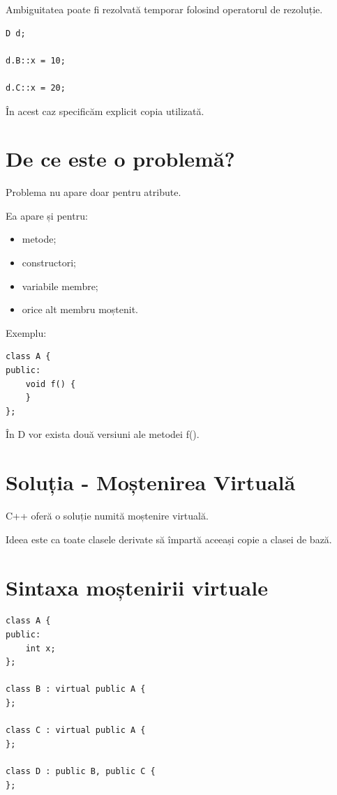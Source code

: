 \documentclass[12pt,a4paper]{article}
\begin{document}
Ambiguitatea poate fi rezolvată temporar folosind operatorul de rezoluție.

\begin{verbatim}
D d;

d.B::x = 10;

d.C::x = 20;
\end{verbatim}

În acest caz specificăm explicit copia utilizată.

\section{De ce este o problemă?}

Problema nu apare doar pentru atribute.

Ea apare și pentru:

\begin{itemize}
\item metode;
\item constructori;
\item variabile membre;
\item orice alt membru moștenit.
\end{itemize}

Exemplu:

\begin{verbatim}
class A {
public:
    void f() {
    }
};
\end{verbatim}

În D vor exista două versiuni ale metodei f().

\section{Soluția - Moștenirea Virtuală}

C++ oferă o soluție numită moștenire virtuală.

Ideea este ca toate clasele derivate să împartă aceeași copie a clasei de bază.

\section{Sintaxa moștenirii virtuale}

\begin{verbatim}
class A {
public:
    int x;
};

class B : virtual public A {
};

class C : virtual public A {
};

class D : public B, public C {
};
\end{verbatim}
\end{document}
